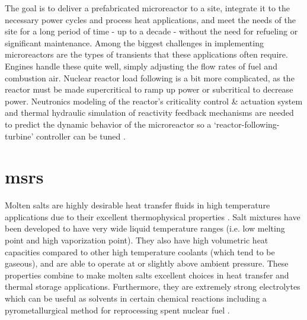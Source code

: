 The goal is to deliver a prefabricated microreactor to a site, integrate it to the necessary power cycles and process heat applications, and meet the needs of the site for a long period of time - up to a decade - without the need for refueling or significant maintenance. Among the biggest challenges in implementing microreactors are the types of transients that these applications often require. Engines handle these quite well, simply adjusting the flow rates of fuel and combustion air. Nuclear reactor load following is a bit more complicated, as the reactor must be made supercritical to ramp up power or subcritical to decrease power. Neutronics modeling of the reactor's criticality control \& actuation system and thermal hydraulic simulation of reactivity feedback mechanisms are needed to predict the dynamic behavior of the microreactor so a  `reactor-following-turbine' controller can be tuned \cite[Ch. 8]{Kerlin}.

\section{\texorpdfstring{\aclp{msr}}{Molten Salt Reactors}}
Molten salts are highly desirable heat transfer fluids in high temperature applications due to their excellent thermophysical properties \cite{RoperReview}. Salt mixtures have been developed to have very wide liquid temperature ranges (i.e. low melting point and high vaporization point). They also have high volumetric heat capacities compared to other high temperature coolants (which tend to be gaseous), and are able to operate at or slightly above ambient pressure. These properties combine to make molten salts excellent choices in heat transfer and thermal storage applications. Furthermore, they are extremely strong electrolytes which can be useful as solvents in certain chemical reactions including a pyrometallurgical method for reprocessing spent nuclear fuel \cite{Simpson}.

